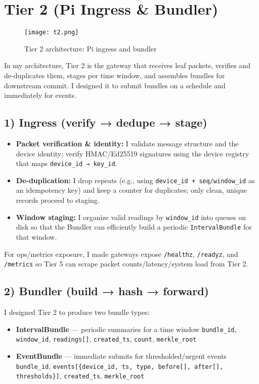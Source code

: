 \documentclass[12pt]{article}
\begin{document}
\section{Tier 2 (Pi Ingress \& Bundler)}

\begin{figure}[H]
\centering
\texttt{[image: t2.png]}
\caption{Tier 2 architecture: Pi ingress and bundler}
\end{figure}
\vspace{-0.5cm} %

In my architecture, Tier 2 is the gateway that receives leaf packets, verifies and de-duplicates them, stages per time window, and assembles bundles for downstream commit. I designed it to submit bundles on a schedule and immediately for events.

\subsection{1) Ingress (verify → dedupe → stage)}

\begin{itemize}
\item \textbf{Packet verification \& identity:} I validate message structure and the device identity; verify HMAC/Ed25519 signatures using the device registry that maps \texttt{device\_id → key\_id}.
\item \textbf{De-duplication:} I drop repeats (e.g., using \texttt{device\_id + seq/window\_id} as an idempotency key) and keep a counter for duplicates; only clean, unique records proceed to staging.
\item \textbf{Window staging:} I organize valid readings by \texttt{window\_id} into queues on disk so that the Bundler can efficiently build a periodic \texttt{IntervalBundle} for that window.
\end{itemize}

For ops/metrics exposure, I made gateways expose \texttt{/healthz}, \texttt{/readyz}, and \texttt{/metrics} so Tier 5 can scrape packet counts/latency/system load from Tier 2.

\subsection{2) Bundler (build → hash → forward)}

I designed Tier 2 to produce two bundle types:

\begin{itemize}
\item \textbf{IntervalBundle} — periodic summaries for a time window  
  \texttt{bundle\_id}, \texttt{window\_id}, \texttt{readings[]}, \texttt{created\_ts}, \texttt{count}, \texttt{merkle\_root}
\item \textbf{EventBundle} — immediate submits for thresholded/urgent events  
  \texttt{bundle\_id}, \texttt{events[\{device\_id, ts, type, before[], after[], thresholds\}]}, \texttt{created\_ts}, \texttt{merkle\_root}
\end{itemize}
\end{document}
